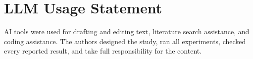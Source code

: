 \section*{LLM Usage Statement}
\label{sec:llm}

AI tools were used for drafting and editing text, literature search assistance, and coding assistance.
The authors designed the study, ran all experiments, checked every reported result, and take full responsibility for the content.

